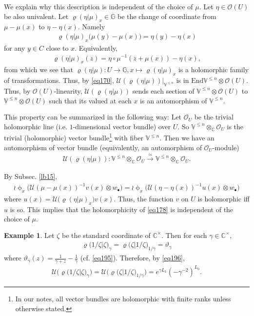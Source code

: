 \documentclass[12pt,a4paper,notitlepage]{article}
\theoremstyle{definition}
\newtheorem{eg}[df]{Example}
\theoremstyle{plain}
\newcommand{\mc}{\mathcal}
\newcommand{\End}{\mathrm{End}} %
\newcommand{\id}{\mathbf{1}}
\newcommand{\scr}{\mathscr}
\newcommand{\blt}{\bullet}
\newcommand{\Vbb}{\mathbb V}
\newcommand{\Gbb}{\mathbb G}
\newcommand{\Cbb}{\mathbb C}
\numberwithin{equation}{section}
\begin{document}
We explain why this description is independent of the choice of $\mu$. Let $\eta\in\scr O(U)$ be also univalent. Let $\varrho(\eta|\mu)_x\in\Gbb$ be the change of coordinate from $\mu-\mu(x)$ to $\eta-\eta(x)$. \index{zz@$\varrho(\alpha\lvert\id),\varrho(\eta\lvert\mu)$} Namely
\begin{align}
\varrho(\eta|\mu)_x\big(\mu(y)-\mu(x)\big)=\eta(y)-\eta(x)	\label{eq177}
\end{align}
for any $y\in C$ close to $x$. Equivalently,
\begin{align}
\varrho(\eta|\mu)_x(z)=\eta\circ\mu^{-1}(z+\mu(x))-\eta(x),\label{eq205}
\end{align}
from which we see that $\varrho(\eta|\mu):U\rightarrow\Gbb,x\mapsto\varrho(\eta|\mu)_x$ is a holomorphic family of transformations. Thus, by \eqref{eq170}, $\mc U(\varrho(\eta|\mu))\big|_{\Vbb^{\leq n}}$ is in $\End\Vbb^{\leq n}\otimes\scr O(U)$. Thus, by $\scr O(U)$-linearity, $\mc U(\varrho(\eta|\mu))$ sends each section of $\Vbb^{\leq n}\otimes\scr O(U)$ to $\Vbb^{\leq n}\otimes\scr O(U)$ such that its valued at each $x$ is an automorphism of $\Vbb^{\leq n}$. 

This property can be summarized in the following way: Let $\scr O_U$ be the trivial holomorphic line (i.e. $1$-dimensional vector bundle) over $U$. So $\Vbb^{\leq n}\otimes_\Cbb\scr O_U$ is the trivial (holomorphic) vector bundle\footnote{In our notes, all vector bundles are holomorphic with finite ranks unless otherwise stated.} with fiber $\Vbb^{\leq n}$. Then  we have an automorphism of vector bundle (equivalently, an automorphism of $\scr O_U$-module)
\begin{align*}
\mc U(\varrho(\eta|\mu)):\Vbb^{\leq n}\otimes_\Cbb \scr O_U\xrightarrow{\simeq} \Vbb^{\leq n}\otimes_\Cbb \scr O_U.	
\end{align*}




By Subsec. \ref{lb15},
\begin{align*}
\wr\upphi_x\big(\mc U(\mu-\mu(x))^{-1}v(x)\otimes w_\blt\big)=	\wr\upphi_x\big(\mc U(\eta-\eta(x))^{-1}u(x)\otimes w_\blt\big)	
\end{align*}
where $u(x)=\mc U\mc(\varrho(\eta|\mu)_x)v(x)$. Thus, the function $v$ on $U$ is holomorphic iff $u$ is so. This implies that the holomorphicity of \eqref{eq178} is independent of the choice of $\mu$.




\begin{eg}
Let $\zeta$ be the standard coordinate of $\Cbb^\times$. Then for each $\gamma\in\Cbb^\times$,
\begin{align}
\varrho\big(1/\zeta\big|\zeta\big)_\gamma=\varrho\big(\zeta\big|1/\zeta\big)_{1/\gamma}=\vartheta_\gamma
\end{align}
where $\vartheta_\gamma(z)=\frac 1{\gamma+z}-\frac 1\gamma$ (cf. \eqref{eq195}). Therefore, by \eqref{eq196},
\begin{align}
\mc U\big(\varrho\big(1/\zeta\big|\zeta\big)_\gamma\big)=\mc U\big(\varrho\big(\zeta\big|1/\zeta\big)_{1/\gamma}\big)=e^{\gamma L_1}(-\gamma^{-2})^{L_0}.\label{eq197}
\end{align}
\end{eg}
\end{document}

